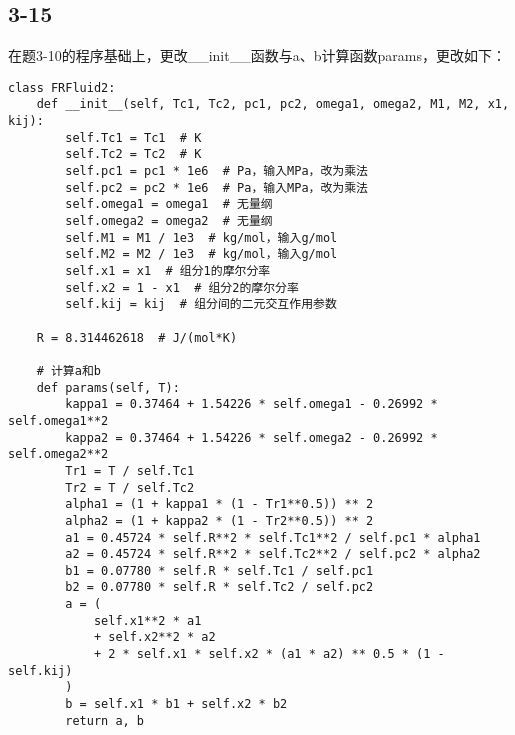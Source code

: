 \documentclass[12pt,a4paper]{article}
\begin{document}
\subsection*{3-15}
在题3-10的程序基础上，更改\_\_init\_\_函数与a、b计算函数params，更改如下：
\begin{lstlisting}
class FRFluid2:
    def __init__(self, Tc1, Tc2, pc1, pc2, omega1, omega2, M1, M2, x1, kij):
        self.Tc1 = Tc1  # K
        self.Tc2 = Tc2  # K
        self.pc1 = pc1 * 1e6  # Pa，输入MPa，改为乘法
        self.pc2 = pc2 * 1e6  # Pa，输入MPa，改为乘法
        self.omega1 = omega1  # 无量纲
        self.omega2 = omega2  # 无量纲
        self.M1 = M1 / 1e3  # kg/mol，输入g/mol
        self.M2 = M2 / 1e3  # kg/mol，输入g/mol
        self.x1 = x1  # 组分1的摩尔分率
        self.x2 = 1 - x1  # 组分2的摩尔分率
        self.kij = kij  # 组分间的二元交互作用参数

    R = 8.314462618  # J/(mol*K)

    # 计算a和b
    def params(self, T):
        kappa1 = 0.37464 + 1.54226 * self.omega1 - 0.26992 * self.omega1**2
        kappa2 = 0.37464 + 1.54226 * self.omega2 - 0.26992 * self.omega2**2
        Tr1 = T / self.Tc1
        Tr2 = T / self.Tc2
        alpha1 = (1 + kappa1 * (1 - Tr1**0.5)) ** 2
        alpha2 = (1 + kappa2 * (1 - Tr2**0.5)) ** 2
        a1 = 0.45724 * self.R**2 * self.Tc1**2 / self.pc1 * alpha1
        a2 = 0.45724 * self.R**2 * self.Tc2**2 / self.pc2 * alpha2
        b1 = 0.07780 * self.R * self.Tc1 / self.pc1
        b2 = 0.07780 * self.R * self.Tc2 / self.pc2
        a = (
            self.x1**2 * a1
            + self.x2**2 * a2
            + 2 * self.x1 * self.x2 * (a1 * a2) ** 0.5 * (1 - self.kij)
        )
        b = self.x1 * b1 + self.x2 * b2
        return a, b

\end{lstlisting}
\end{document}
